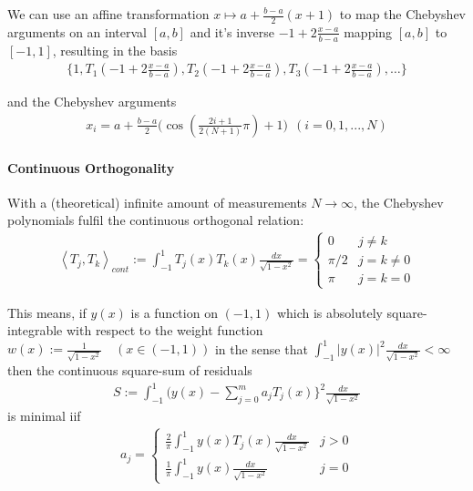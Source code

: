 We can use an affine transformation $x\mapsto a + \frac{b-a}{2}(x+1)$ to map the
Chebyshev arguments on an interval $[a,b]$ and it's inverse
$-1+2\frac{x-a}{b-a}$ mapping $[a,b]$ to $[-1, 1]$, resulting in the basis
\begin{align*}
    \{1,T_{1}(-1+2\frac{x-a}{b-a}),T_{2}(-1+2\frac{x-a}{b-a}),T_{3}(-1+2\frac{x-a}{b-a}),\ldots\}
\end{align*}

and the Chebyshev arguments
\begin{align*}
    x_{i}=a+\frac{b-a}{2}\Biggl(\cos\left(\frac{2i+1}{2(N+1)}\pi\right)+1\Biggr)\ \ (i=0,1,...,N)
\end{align*}

\paragraph{Continuous Orthogonality}

With a (theoretical) infinite amount of measurements $N\to\infty$,
the Chebyshev polynomials fulfil the continuous orthogonal relation:
\begin{align*}
    \left\langle T_{j},T_{k}\right\rangle_{cont}
    := \int_{-1}^{1} T_{j}(x)T_{k}(x)\frac{d x}{\sqrt{1-x^{2}}} =
    \left\{
    \begin{matrix}
        0       & j \neq k     \\
        \pi / 2 & j = k \neq 0 \\
        \pi     & j = k = 0
    \end{matrix}
    \right.
\end{align*}

This means, if $y(x)$ is a function on $(-1,1)$ which is absolutely square-integrable with respect to the
weight function $w(x):={\frac{1}{\sqrt{1-x^{2}}}}\quad(x\in(-1,1))$ in the sense that
$\int_{-1}^1|y(x)|^{2}{\frac{d x}{{\sqrt{1-x^{2}}}}<\infty}$
then the continuous square-sum of residuals
\begin{align*}
    S := \int_{-1}^1\biggl(y(x)-\sum_{j=0}^{m}a_{j}T_{j}(x)\biggr\}^{2}\frac{d x}{\sqrt{1-x^{2}}}
\end{align*}
is minimal iif
\begin{align*}
    a_{j} =
    \left\{
    \begin{matrix}
        \frac{2}{\pi}\int_{-1}^{1}y(x)T_{j}(x)\frac{d x}{\sqrt{1-x^{2}}} & j > 0 \\
        \frac{1}{\pi}\int_{-1}^{1}y(x)\frac{d x}{\sqrt{1-x^{2}}}         & j = 0
    \end{matrix}
    \right.
\end{align*}

